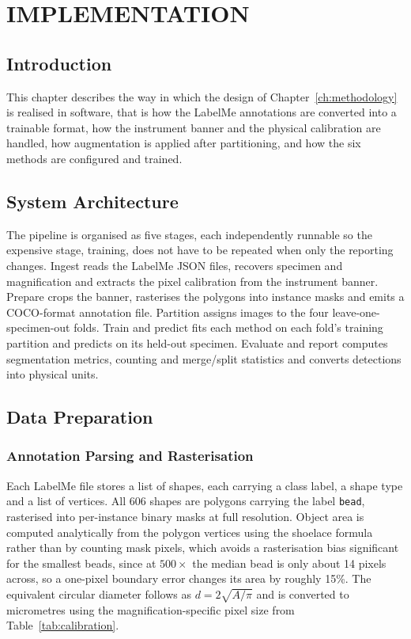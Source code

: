 \chapter{IMPLEMENTATION}
\label{ch:implementation}

\section{Introduction}

This chapter describes the way in which the design of Chapter~\ref{ch:methodology}
is realised in software, that is how the LabelMe annotations are converted into a
trainable format, how the instrument banner and the physical calibration are
handled, how augmentation is applied after partitioning, and how the six methods are
configured and trained.

\section{System Architecture}

The pipeline is organised as five stages, each independently runnable so the
expensive stage, training, does not have to be repeated when only the reporting
changes. Ingest reads the LabelMe JSON files, recovers specimen and
magnification and extracts the pixel calibration from the instrument banner.
Prepare crops the banner, rasterises the polygons into instance masks and emits a
COCO-format annotation file. Partition assigns images to the four
leave-one-specimen-out folds. Train and predict fits each method on each fold's
training partition and predicts on its held-out specimen. Evaluate and report
computes segmentation metrics, counting and merge/split statistics and converts
detections into physical units.

\section{Data Preparation}

\subsection{Annotation Parsing and Rasterisation}
\label{sec:parsing}

Each LabelMe file stores a list of shapes, each carrying a class label, a shape
type and a list of vertices. All 606 shapes are polygons carrying the label
\texttt{bead}, rasterised into per-instance binary masks at full resolution.
Object area is computed analytically from the polygon vertices using the shoelace
formula rather than by counting mask pixels, which avoids a rasterisation bias
significant for the smallest beads, since at $500\times$ the median bead is only
about 14 pixels across, so a one-pixel boundary error changes its area by roughly
15\%. The equivalent circular diameter follows as $d = 2\sqrt{A/\pi}$ and is
converted to micrometres using the magnification-specific pixel size from
Table~\ref{tab:calibration}.


